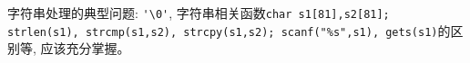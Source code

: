 \begin{note}[要点]
	字符串处理的典型问题: \lstinline|'\0'|, 字符串相关函数\lstinline|char s1[81],s2[81]; strlen(s1), strcmp(s1,s2), strcpy(s1,s2); scanf("%s",s1), gets(s1)|的区别等, 应该充分掌握。
\end{note}

\begin{comment}

\section{矩阵}
请写一个程序，对于一个m行m列$(2<m<20)$的方阵，求其每一行、每一列及主、辅对角线元素之和，然后按照从大到小的顺序依次输出这些值。

注：主对角线是方阵从左上角到右下角的一条斜线，辅对角线是方阵从右上角到左下角的一条斜线。

输入说明

输入数据的第一行为一个正整数m;

接下来为m行、每行m个整数表示方阵的元素。

输出说明	

从大到小排列的一行整数，每个整数后跟一个空格，最后换行。

输入样例

4

15  8   -2   6

31  24  18  71

-3  -9   27  13

17  21  38  69

输出样例

159 145 144 135 81 60 44 32 28 27

\begin{lstlisting}
#include <stdio.h>
// 估计方阵行列数 
#define M 20

// input, m是实际方阵行列数 
void input(int matrix[][M], int m)
{
int i,j; 
for(i = 0; i < m; i++)
for(j = 0; j < m; j++) 
scanf("%
}

// 计算主对角线之和, m是实际方阵行列数 
int main_diagonal(int matrix[][M], int m)
{	
int i,j,sum = 0; 
for(i = 0; i < m; i++)
{
for(j = 0; j < m; j++) 
{
if(i == j) sum += matrix[i][j];   // 主对角线 
}
}
return sum;
}

// 计算副对角线之和, m是实际方阵行列数 
int counter_diagonal(int matrix[][M], int m)
{	
int i,j,sum = 0;
for(i = 0; i < m; i++)
{
for(j = 0; j < m; j++) 
{ 
if(j == m-i-1) sum += matrix[i][j]; // 副对角线之和 
}
}
return sum;
}

// 计算第i行之和, m是实际方阵行列数 
int sumI(int matrix[][M], int m, int i)
{ 
int j,sum = 0; 
for(j = 0; j < m; j++) // 遍历列 
{
sum += matrix[i][j];  // 第i行之和
}
return sum; 
} 


\end{comment}
